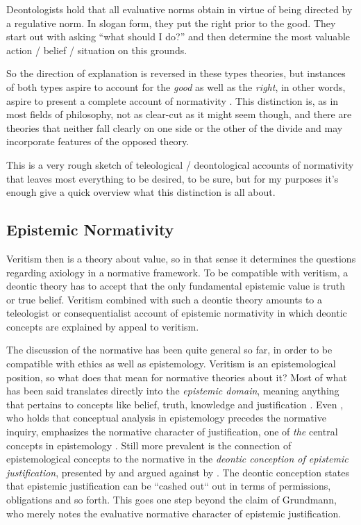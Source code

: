 \documentclass[12pt,numbers=noenddot]{scrartcl}
\begin{document}
Deontologists hold that all evaluative norms obtain in virtue of being directed by a regulative norm. In slogan form, they put the right prior to the good. They start out with asking “what should I do?” and then determine the most valuable action / belief / situation on this grounds. 

So the direction of explanation is reversed in these types theories, but instances of both types aspire to account for the \emph{good} as well as the \emph{right}, in other words, aspire to present a complete account of normativity \parencite[341]{Berker2013-BERETA-2}. This distinction is, as in most fields of philosophy, not as clear-cut as it might seem though, and there are theories that neither fall clearly on one side or the other of the divide and may incorporate features of the opposed theory.

This is a very rough sketch of teleological / deontological accounts of normativity that leaves most everything to be desired, to be sure, but for my purposes it's enough give a quick overview what this distinction is all about.

\subsection{Epistemic Normativity} \label{subsec: epistemic}

Veritism then is a theory about value, so in that sense it determines the questions regarding axiology in a normative framework. To be compatible with veritism, a deontic theory has to accept that the only fundamental epistemic value is truth or true belief. Veritism combined with such a deontic theory amounts to a teleologist or consequentialist account of epistemic normativity in which deontic concepts are explained by appeal to veritism.

The discussion of the normative has been quite general so far, in order to be compatible with ethics as well as epistemology. Veritism is an epistemological position, so what does that mean for normative theories about it? Most of what has been said translates directly into the \emph{epistemic domain}, meaning anything that pertains to concepts like belief, truth, knowledge and justification \autocite{David2001-DAVTAT-7}. Even \textcite[7]{grundmann2008}, who holds that conceptual analysis in epistemology precedes the normative inquiry, emphasizes the normative character of justification, one of \emph{the} central concepts in epistemology \autocite[226]{grundmann2008}. Still more prevalent is the connection of epistemological concepts to the normative in the \emph{deontic conception of epistemic justification}, presented by \textcite{Steup1988-STETDC} and argued against by \textcite{Alston1988-ALSTDC}. The deontic conception states that epistemic justification can be “cashed out“ out in terms of permissions, obligations and so forth. This goes one step beyond the claim of Grundmann, who merely notes the evaluative normative character of epistemic justification.
\end{document}
